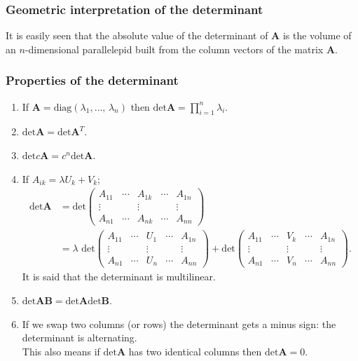 \documentclass{article}
\begin{document}
\subsubsection{Geometric interpretation of the determinant}
It is easily seen that the absolute value of the determinant of $\mathbf{A}$ is the volume of an $n$-dimensional parallelepid built from the column vectors of the matrix $\mathbf{A}$.


\subsubsection{Properties of the determinant}
\begin{enumerate}
    \item If $\mathbf{A}=\text{diag}(\lambda_1,\ldots,\,\lambda_n)$ then $\text{det}\mathbf{A}=\prod_{i=1}^n\lambda_i$.
    \item $\text{det}\mathbf{A} = \text{det}\mathbf{A}^T$.
    \item $\text{det}c\mathbf{A} = c^n\text{det}\mathbf{A}$.
    \item If $A_{ik} = \lambda U_k + V_k$;
    \begin{align}
        \text{det}\mathbf{A} &= \text{det}\begin{pmatrix}
            A_{11} & \cdots & A_{1k} & \cdots & A_{1n} \\
            \vdots &  & \vdots &  & \vdots \\
            A_{n1} & \cdots & A_{nk} & \cdots & A_{nn}
        \end{pmatrix} \\
        &= \lambda\text{ det}\begin{pmatrix}
            A_{11} & \cdots & U_1 & \cdots & A_{1n} \\
            \vdots &  & \vdots &  & \vdots \\
            A_{n1} & \cdots & U_n & \cdots & A_{nn}
        \end{pmatrix} + \text{det}\begin{pmatrix}
            A_{11} & \cdots & V_k & \cdots & A_{1n} \\
            \vdots &  & \vdots &  & \vdots \\
            A_{n1} & \cdots & V_n & \cdots & A_{nn}
        \end{pmatrix}.
    \end{align}
    It is said that the determinant is multilinear.
    \item $\text{det}\mathbf{AB} = \text{det}\mathbf{A}\text{det}\mathbf{B}$.
    \item If we swap two columns (or rows) the determinant gets a minus sign: the determinant is alternating.\\
    This also means if $\text{det}\mathbf{A}$ has two identical columns then $\text{det}\mathbf{A}=0$.
\end{enumerate}
\end{document}
